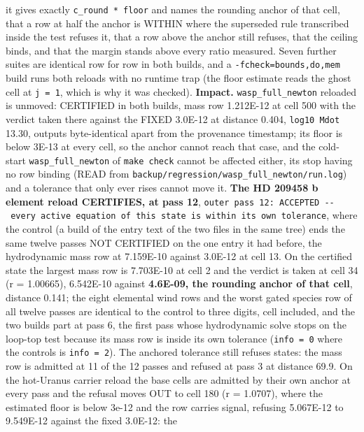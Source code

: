 \documentclass[english,a4paper]{my_memo}
\begin{document}
\begin{itemize}
  it gives exactly \texttt{c\_round\ *\ floor} and names the rounding anchor of that
  cell, that a row at half the anchor is WITHIN where the superseded rule
  transcribed inside the test refuses it, that a row above the anchor still
  refuses, that the ceiling binds, and that the margin stands above every ratio
  measured. Seven further suites are identical row for row in both builds, and a
  \texttt{-fcheck=bounds,do,mem} build runs both reloads with no runtime trap (the
  floor estimate reads the ghost cell at \texttt{j\ =\ 1}, which is why it was checked).
  \textbf{Impact.} \texttt{wasp\_full\_newton} reloaded is unmoved: CERTIFIED in both builds,
  mass row 1.212E-12 at cell 500 with the verdict taken there against the FIXED
  3.0E-12 at distance 0.404, \texttt{log10\ Mdot} 13.30, outputs byte-identical apart
  from the provenance timestamp; its floor is below 3E-13 at every cell, so the
  anchor cannot reach that case, and the cold-start \texttt{wasp\_full\_newton} of
  \texttt{make\ check} cannot be affected either, its stop having no row binding (READ
  from \texttt{backup/regression/wasp\_full\_newton/run.log}) and a tolerance that only
  ever rises cannot move it. \textbf{The HD 209458 b element reload CERTIFIES, at
  pass 12}, \texttt{outer\ pass\ 12:\ ACCEPTED\ -\/-\ every\ active\ equation\ of\ this\ state\ is\ within\ its\ own\ tolerance}, where the control (a build of the entry text of
  the two files in the same tree) ends the same twelve passes NOT CERTIFIED on
  the one entry it had before, the hydrodynamic mass row at 7.159E-10 against
  3.0E-12 at cell 13. On the certified state the largest mass row is 7.703E-10
  at cell 2 and the verdict is taken at cell 34 (r = 1.00665), 6.542E-10
  against \textbf{4.6E-09, the rounding anchor of that cell}, distance 0.141; the
  eight elemental wind rows and the worst gated species row of all twelve
  passes are identical to the control to three digits, cell included, and the
  two builds part at pass 6, the first pass whose hydrodynamic solve stops on the
  loop-top test because its mass row is inside its own tolerance (\texttt{info\ =\ 0}
  where the control\textquotesingle s is \texttt{info\ =\ 2}). The anchored tolerance still refuses
  states: the mass row is admitted at 11 of the 12 passes and refused at pass 3
  at distance 69.9. On the hot-Uranus carrier reload the base cells are
  admitted by their own anchor at every pass and the refusal moves OUT to cell
  180 (r = 1.0707), where the estimated floor is below 3e-12 and the row
  carries signal, refusing 5.067E-12 to 9.549E-12 against the fixed 3.0E-12: the

\end{itemize}
\end{document}
